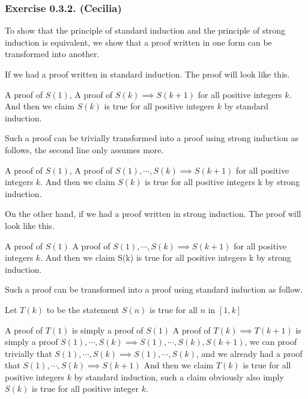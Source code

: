 \subsubsection*{Exercise 0.3.2. (Cecilia)}

\begin{flushleft}
To show that the principle of standard induction and the principle of strong induction is equivalent, we show that a proof written in one form can be transformed into another. 
\vspace{10px}

If we had a proof written in standard induction. The proof will look like this.
\vspace{10px}

A proof of $S(1)$,
A proof of $S(k) \implies S(k + 1)$ for all positive integers $k$.
And then we claim $S(k)$ is true for all positive integers $k$ by standard induction.
\vspace{10px}

Such a proof can be trivially transformed into a proof using strong induction as follows, 
the second line only assumes more.
\vspace{10px}

A proof of $S(1)$,
A proof of $S(1), \cdots, S(k) \implies S(k + 1)$ for all positive integers $k$.
And then we claim $S(k)$ is true for all positive integers k by strong induction.
\vspace{10px}

On the other hand, if we had a proof written in strong induction. 
The proof will look like this.
\vspace{10px}

A proof of $S(1)$
A proof of $S(1), \cdots, S(k) \implies S(k + 1)$ for all positive integers $k$.
And then we claim S(k) is true for all positive integers k by strong induction.
\vspace{10px}

Such a proof can be transformed into a proof using standard induction as follow. 
\vspace{10px}

Let $T(k)$ to be the statement $S(n)$ is true for all $n$ in $[1, k]$
\vspace{10px}

A proof of $T(1)$ is simply a proof of $S(1)$
A proof of $T(k) \implies T(k + 1)$ is simply a proof 
$S(1), \cdots, S(k) \implies S(1), \cdots, S(k), S(k + 1)$, 
we can proof trivially that $S(1), \cdots, S(k) \implies S(1), \cdots, S(k)$, 
and we already had a proof that $S(1), \cdots, S(k) \implies S(k + 1)$
And then we claim $T(k)$ is true for all positive integers $k$ by standard induction, 
such a claim obviously also imply $S(k)$ is true for all positive integer $k$.
\vspace{10px}


\end{flushleft}
